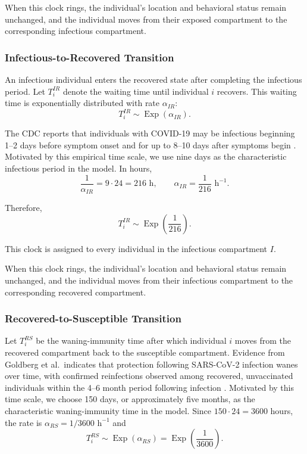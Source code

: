\documentclass[11pt]{article}
\theoremstyle{definition}
\theoremstyle{plain}
\begin{document}
When this clock rings, the individual's location and behavioral status remain unchanged, and the individual moves from their exposed compartment to the corresponding infectious compartment.

\subsubsection{Infectious-to-Recovered Transition}
\label{sec:ir}

An infectious individual enters the recovered state after completing the infectious period. Let $T_i^{IR}$ denote the waiting time until individual $i$ recovers. This waiting time is exponentially distributed with rate $\alpha_{IR}$:
\[
T_i^{IR}\sim\operatorname{Exp}(\alpha_{IR}).
\]

The CDC reports that individuals with COVID-19 may be infectious beginning
1--2 days before symptom onset and for up to 8--10 days after symptoms begin
\cite{cdcyellowbook}. Motivated by this empirical time scale, we use nine
days as the characteristic infectious period in the model. In hours,
\[
\frac{1}{\alpha_{IR}}=9\cdot 24=216\text{ h},
\qquad
\alpha_{IR}=\frac{1}{216}\text{ h}^{-1}.
\]

Therefore,
\[
T_i^{IR}\sim\operatorname{Exp}\left(\frac{1}{216}\right).
\]

This clock is assigned to every individual in the infectious compartment $I$.

When this clock rings, the individual's location and behavioral status remain unchanged, and the individual moves from their infectious compartment to the corresponding recovered compartment.


\subsubsection{Recovered-to-Susceptible Transition}
\label{sec:rs}

Let $T_i^{RS}$ be the waning-immunity time after which individual $i$ moves from the recovered compartment back to the susceptible compartment. Evidence from Goldberg et al.\ indicates that protection following
SARS-CoV-2 infection wanes over time, with confirmed reinfections observed
among recovered, unvaccinated individuals within the 4--6 month period
following infection \cite{goldberg2022}. Motivated by this time scale, we
choose 150 days, or approximately five months, as the characteristic
waning-immunity time in the model. Since $150\cdot 24=3600$ hours, the rate is $\alpha_{RS}=1/3600\text{ h}^{-1}$ and
\[
T_i^{RS} \sim \operatorname{Exp}(\alpha_{RS}) = \operatorname{Exp}\left(\frac{1}{3600}\right).
\]
\end{document}
